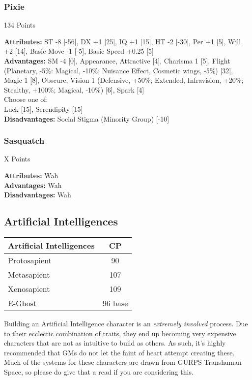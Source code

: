 \begin{multicols*}{3}
	\subsubsection*{Pixie}
	\begin{flushright}
		134 Points
	\end{flushright}
	\textbf{Attributes:} 
	ST -8 [-56], DX +1 [25], IQ +1 [15], HT -2 [-30], Per +1 [5], Will +2 [14], Basic Move -1 [-5], Basic Speed +0.25 [5]
	\\\textbf{Advantages:} 
	SM -4 [0], Appearance, Attractive [4], Charisma 1 [5], Flight (Planetary, -5\%: Magical, -10\%; Nuisance Effect,  Cosmetic wings, -5\%) [32], Magic 1 [8], Obscure, Vision 1 (Defensive, +50\%; Extended, Infravision, +20\%; Stealthy, +100\%; Magical, -10\%) [6], Spark [4]
	\\ Choose one of: \\
	Luck [15], Serendipity [15]
	\\\textbf{Disadvantages:}
	Social Stigma (Minority Group) [-10]
	
	\subsubsection*{Sasquatch}
	\begin{flushright}
		X Points
	\end{flushright}
	\textbf{Attributes:} 
	Wah
	\\\textbf{Advantages:} 
	Wah
	\\\textbf{Disadvantages:} 
	Wah
	
	\subsection{Artificial Intelligences}
	
	\begin{center}
		\begin{tabularx}{0.32\textwidth}{|X|c|}
			\hline
			Artificial Intelligences & CP \\
			\hline
			\hline
			Protosapient & 90\\
			Metasapient & 107\\
			Xenosapient & 109 \\
			E-Ghost & 96 base\\
			\hline
		\end{tabularx}
	\end{center}
	
	Building an Artificial Intelligence character is an \textit{extremely involved} process. Due to their ecclectic combination of traits, they end up becoming very expensive characters that are not as intuitive to build as others. As such, it's highly recommended that GMs do not let the faint of heart attempt creating these. Much of the systems for these characters are drawn from GURPS Transhuman Space, so please do give that a read if you are considering this.
	

\end{multicols*}
